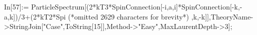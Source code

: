 In[57]:= ParticleSpectrum[(2*kT3*SpinConnection[-i,a,i]*SpinConnection[-k,-a,k])/3+(2*kT2*Spi (*omitted 2629 characters for brevity*) ,k,-k]],TheoryName->StringJoin["Case",ToString[15]],Method->"Easy",MaxLaurentDepth->3];